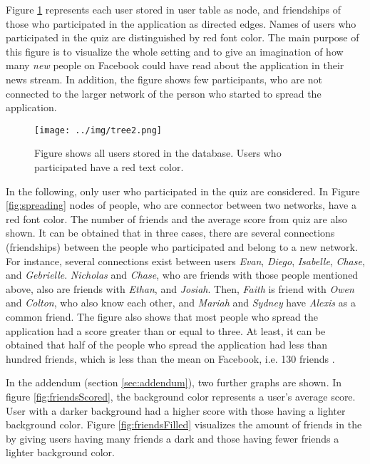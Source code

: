 \documentclass[preprint,12pt]{elsarticle}
\begin{document}
Figure \ref{fig:allUsers} represents each user stored in user
table as node, and friendships of those who participated in the
application as directed edges. Names of users who participated in the quiz are distinguished by
red font color. The main purpose of this figure is to visualize the
whole setting and to give an imagination of how many \textit{new}
people on Facebook could have read about the application in their 
news stream. In addition, the figure shows few participants, who are
not connected to the larger network of the 
person who started to spread the application.

\begin{figure}
  \texttt{[image: ../img/tree2.png]}
\caption{Figure shows all users stored in the database. Users who
  participated have a red text color.}
\label{fig:allUsers}
\end{figure}

In the following, only user who participated in the quiz are
considered. In Figure \ref{fig:spreading} nodes of people, who are
connector between two networks, have a red font color. The number of
friends and the average score from quiz are also shown. 
It can be obtained that in three cases, there are several connections (friendships)
between the people who participated and belong to a new network. For
instance, several connections exist between users \textit{Evan},
\textit{Diego}, \textit{Isabelle}, \textit{Chase}, and \textit{Gebrielle}.
\textit{Nicholas} and \textit{Chase}, who are friends with those
people mentioned above, also are friends with \textit{Ethan},
and \textit{Josiah}.  Then, \textit{Faith} is friend with
\textit{Owen} and \textit{Colton}, who also know each other, and
\textit{Mariah} and \textit{Sydney} have \textit{Alexis} as a common
friend. The figure also shows that most people who spread the
application had a score greater than or equal to three. At least, it
can be obtained that half of the people who spread the application
had less than hundred friends, which is less than the mean on
Facebook, i.e. 130 friends \cite{facebookStats}.

In the addendum (section \ref{sec:addendum}), two further graphs are
shown. In figure \ref{fig:friendsScored}, the background color
represents a user's average score. User with a darker background had a
higher score with those having a lighter background color. 
Figure \ref{fig:friendsFilled} visualizes the amount of friends in the
by giving users having many friends a dark and those having fewer
friends a lighter background color. 
\end{document}
